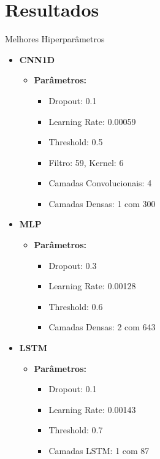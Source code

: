 \documentclass[10pt]{beamer}
\begin{document}
\section{Resultados}

\begin{frame}{Melhores Hiperparâmetros}
\begin{itemize}
  \item \textbf{CNN1D}
  \begin{itemize}
    \item \textbf{Parâmetros:}
      \begin{itemize}
        \item Dropout: 0.1
        \item Learning Rate: 0.00059
        \item Threshold: 0.5
        \item Filtro: 59, Kernel: 6
        \item Camadas Convolucionais: 4
        \item Camadas Densas: 1 com 300
      \end{itemize}
  \end{itemize}
  
  \item \textbf{MLP}
  \begin{itemize}
    \item \textbf{Parâmetros:}
      \begin{itemize}
        \item Dropout: 0.3
        \item Learning Rate: 0.00128
        \item Threshold: 0.6
        \item Camadas Densas: 2 com 643
      \end{itemize}
  \end{itemize}

  \item \textbf{LSTM}
  \begin{itemize}
    \item \textbf{Parâmetros:}
      \begin{itemize}
        \item Dropout: 0.1
        \item Learning Rate: 0.00143
        \item Threshold: 0.7
        \item Camadas LSTM: 1 com 87
      \end{itemize}
  \end{itemize}
\end{itemize}
\end{frame}
\end{document}
